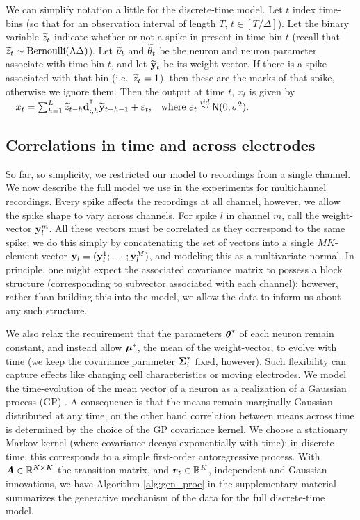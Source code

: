 We can simplify notation a little for the discrete-time model. Let $t$ index time-bins (so that for an observation interval of length 
$T$, $t \in [T/\Delta]$).
Let the binary variable $\widetilde{z}_t$ indicate whether or not a spike in present in time bin $t$ (recall that 
$\widetilde{z}_t \sim \text{Bernoulli}(\Lambda \Delta)$). Let
$\widetilde{\nu}_t$ and $\widetilde{\theta}_t$ be the neuron and neuron parameter associate with time bin $t$, and let $\widetilde{\mathbf{y}}_t$ be its weight-vector. 
If there is a spike associated with that bin (i.e.\ 
$\widetilde{z}_t = 1$), then these are the marks of that spike, otherwise we ignore them.
Then the output at time $t$, $x_t$ is given by
$\quad  x_t = \sum_{h = 1}^L \widetilde{z}_{t-h} \mathsf{\mathbf{d}}_{:,h}^{^{\mathsf{T}}} \widetilde{\mathbf{y}}_{t-h-1} + \varepsilon_t \text{,\quad where $\varepsilon_t \overset{iid}{\sim} \mathsf{N}(0,\sigma^2)$.}$ 
\subsection{Correlations in time and across electrodes}
So far, so simplicity, we restricted our model to recordings from a single channel. We now describe the full model we use in the experiments for
multichannel recordings. Every spike affects the recordings at all channel, however, we allow the spike shape to vary across channels. 
For spike $l$ in channel $m$, call the weight-vector $\mathbf{y}^m_l$. All these vectors must be correlated as they correspond to the same spike; we do this 
simply by concatenating the set of vectors into
a single $MK$-element vector $\mathbf{y}_l = (\mathbf{y}^1_l;\cdots;\mathbf{y}^M_l)$, and modeling this as a multivariate normal. In principle, one might expect the associated 
covariance matrix to possess a block structure (corresponding to subvector associated with each channel); however, rather than building this into the model,
we allow the data to inform us about any such structure.

We also relax the requirement that the parameters $\boldsymbol{\theta}^*$ of each neuron remain constant, and instead allow $\boldsymbol{\mu}^*$, the mean of the weight-vector,
to evolve with time (we keep the covariance parameter $\boldsymbol{\Sigma}^*_i$ fixed, however). Such flexibility can capture effects like changing cell 
characteristics or moving electrodes.
We model the time-evolution of the mean vector of a neuron as a realization of a Gaussian process (GP) \citep{RasWil2006}. A consequence is that the 
means remain marginally Gaussian distributed at any time, on the other hand correlation between means across time is determined by the choice 
of the GP covariance kernel.
We choose a stationary Markov kernel (where covariance decays exponentially with time); in discrete-time, this corresponds to a simple first-order 
autoregressive process. With $\boldsymbol{A} \in \mathbb{R}^{K \times K}$ the transition matrix, and $\boldsymbol{r}_t \in \mathbb{R}^K$, 
independent and Gaussian {innovations}, we have
Algorithm \ref{alg:gen_proc} in the supplementary material summarizes the generative mechanism of the data for the full discrete-time model.


